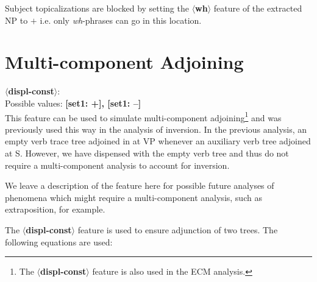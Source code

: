Subject topicalizations are blocked by setting the 
{\bf $\langle$wh$\rangle$} feature of the extracted NP to $+$ i.e. only 
{\em wh}-phrases can go in this location. 
 
 
\section{Multi-component Adjoining} 
 
{\bf $\langle$displ-const$\rangle$}:\\ Possible values: {\bf [set1: +], [set1: --]}\\ This feature can be used to simulate multi-component 
adjoining\footnote{The {\bf $\langle$displ-const$\rangle$} feature is also used in the ECM analysis.} and was previously used this way in the analysis of 
inversion. In the previous analysis, an empty verb trace tree adjoined in 
at VP whenever an auxiliary verb tree adjoined at S. 
However, we have dispensed with the empty verb tree and thus do not require a 
multi-component analysis to account for inversion. 
 
We leave a description of the feature here for possible future analyses of 
phenomena which might require a multi-component analysis, such as 
extraposition, for example. 
 
% 
The {\bf $\langle$displ-const$\rangle$} feature is used to ensure 
adjunction of two trees. 
The following equations are used: 
 
